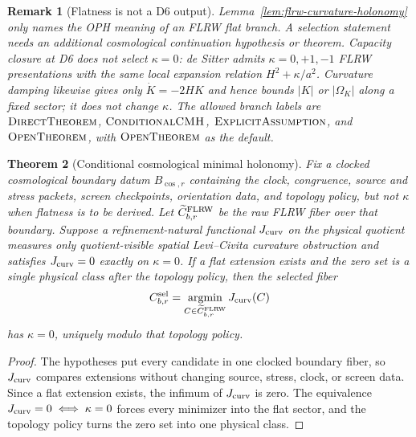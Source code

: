 \documentclass[11pt]{article}
\newtheorem{theorem}{Theorem}[section]
\newtheorem{remark}[theorem]{Remark}
\begin{document}
\begin{remark}[Flatness is not a D6 output]\label{rem:flrw-holonomy-boundary}
Lemma~\ref{lem:flrw-curvature-holonomy} only names the OPH meaning of an FLRW flat branch. A
selection statement needs an additional cosmological continuation hypothesis or theorem. Capacity
closure at D6 does not select \(\kappa=0\): de Sitter admits \(\kappa=0,+1,-1\) FLRW presentations
with the same local expansion relation \(H^2+\kappa/a^2\). Curvature damping likewise gives only
\(\dot K=-2HK\) and hence bounds \(|K|\) or \(|\Omega_K|\) along a fixed sector; it does not change
\(\kappa\). The allowed branch labels are
\(\textup{\textsc{DirectTheorem}}\), \(\textup{\textsc{ConditionalCMH}}\),
\(\textup{\textsc{ExplicitAssumption}}\), and
\(\textup{\textsc{OpenTheorem}}\), with
\(\textup{\textsc{OpenTheorem}}\) as the default.
\end{remark}

\begin{theorem}[Conditional cosmological minimal holonomy]\label{thm:conditional-cmh}
Fix a clocked cosmological boundary datum \(B_{\cos,r}\) containing the clock, congruence, source
and stress packets, screen checkpoints, orientation data, and topology policy, but not \(\kappa\)
when flatness is to be derived. Let \(\widetilde C^{\rm FLRW}_{b,r}\) be the raw FLRW fiber over
that boundary. Suppose a refinement-natural functional \(J_{\rm curv}\) on the physical quotient
measures only quotient-visible spatial Levi--Civita curvature obstruction and satisfies
\(J_{\rm curv}=0\) exactly on \(\kappa=0\). If a flat extension exists and the zero set is a single
physical class after the topology policy, then the selected fiber
\[
C^{\rm sel}_{b,r}
=
\operatorname*{argmin}_{C\in\widetilde C^{\rm FLRW}_{b,r}}J_{\rm curv}(C)
\]
has \(\kappa=0\), uniquely modulo that topology policy.
\end{theorem}

\begin{proof}
The hypotheses put every candidate in one clocked boundary fiber, so \(J_{\rm curv}\) compares
extensions without changing source, stress, clock, or screen data. Since a flat extension exists,
the infimum of \(J_{\rm curv}\) is zero. The equivalence \(J_{\rm curv}=0\iff\kappa=0\) forces every
minimizer into the flat sector, and the topology policy turns the zero set into one physical class.
\end{proof}
\end{document}
